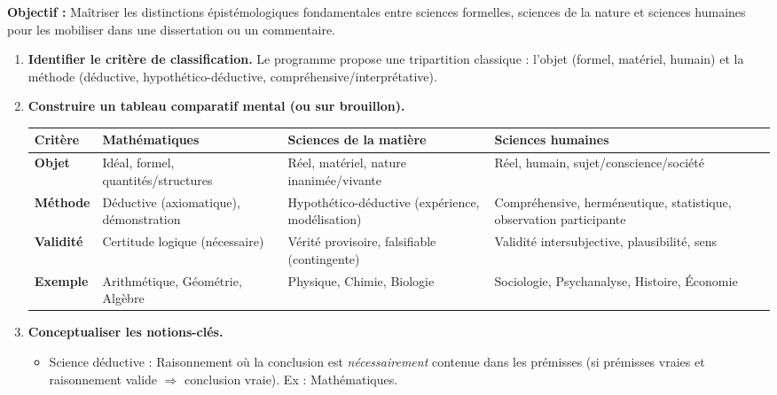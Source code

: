 \documentclass[11pt]{article}
\newcommand{\cle}[1]{{\popxbold\color{popdark}#1}}
\begin{document}
\begin{methode}
    \textbf{Objectif :} Maîtriser les distinctions épistémologiques fondamentales entre sciences formelles, sciences de la nature et sciences humaines pour les mobiliser dans une dissertation ou un commentaire.
    \begin{enumerate}
        \item \textbf{Identifier le critère de classification.} Le programme propose une tripartition classique : l'objet (formel, matériel, humain) et la méthode (déductive, hypothético-déductive, compréhensive/interprétative).
        \item \textbf{Construire un tableau comparatif mental (ou sur brouillon).}
        \begin{center}
            \begin{tabularx}{\linewidth}{|l|X|X|X|}
                \hline
                \rowcolor{popblueL}
                \textbf{Critère} & \textbf{Mathématiques} & \textbf{Sciences de la matière} & \textbf{Sciences humaines} \\
                \hline
                \textbf{Objet} & Idéal, formel, quantités/structures & Réel, matériel, nature inanimée/vivante & Réel, humain, sujet/conscience/société \\
                \hline
                \textbf{Méthode} & Déductive (axiomatique), démonstration & Hypothético-déductive (expérience, modélisation) & Compréhensive, herméneutique, statistique, observation participante \\
                \hline
                \textbf{Validité} & Certitude logique (nécessaire) & Vérité provisoire, falsifiable (contingente) & Validité intersubjective, plausibilité, sens \\
                \hline
                \textbf{Exemple} & Arithmétique, Géométrie, Algèbre & Physique, Chimie, Biologie & Sociologie, Psychanalyse, Histoire, Économie \\
                \hline
            \end{tabularx}
        \end{center}
        \item \textbf{Conceptualiser les notions-clés.}
        \begin{itemize}
            \item \cle{Science déductive} : Raisonnement où la conclusion est \emph{nécessairement} contenue dans les prémisses (si prémisses vraies et raisonnement valide $\Rightarrow$ conclusion vraie). Ex : Mathématiques.

\end{itemize}
\end{enumerate}
\end{methode}
\end{document}
